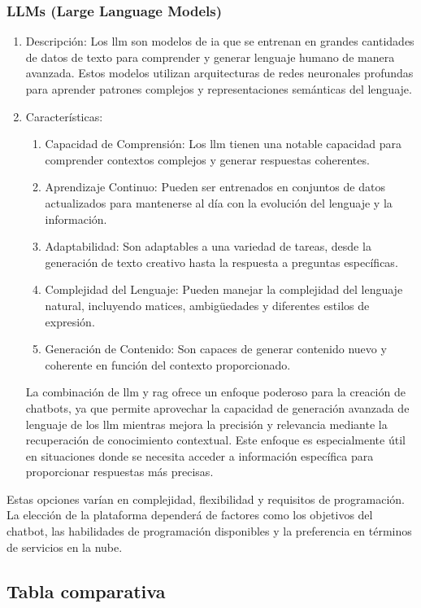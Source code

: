 \subsubsection{LLMs (Large Language Models)}
\begin{enumerate}
\item Descripción: Los \acrfull{llm} son modelos de \acrlong{ia} que se entrenan en grandes cantidades de datos de texto para comprender y generar lenguaje humano de manera avanzada. Estos modelos utilizan arquitecturas de redes neuronales profundas para aprender patrones complejos y representaciones semánticas del lenguaje.
\item Características:
\begin{enumerate}
\item Capacidad de Comprensión: Los \acrshort{llm} tienen una notable capacidad para comprender contextos complejos y generar respuestas coherentes.
\item Aprendizaje Continuo: Pueden ser entrenados en conjuntos de datos actualizados para mantenerse al día con la evolución del lenguaje y la información.
\item Adaptabilidad: Son adaptables a una variedad de tareas, desde la generación de texto creativo hasta la respuesta a preguntas específicas.
\item Complejidad del Lenguaje: Pueden manejar la complejidad del lenguaje natural, incluyendo matices, ambigüedades y diferentes estilos de expresión.
\item Generación de Contenido: Son capaces de generar contenido nuevo y coherente en función del contexto proporcionado.
\end{enumerate}
La combinación de \acrshort{llm} y \acrshort{rag} ofrece un enfoque poderoso para la creación de chatbots, ya que permite aprovechar la capacidad de generación avanzada de lenguaje de los \acrshort{llm} mientras mejora la precisión y relevancia mediante la recuperación de conocimiento contextual. Este enfoque es especialmente útil en situaciones donde se necesita acceder a información específica para proporcionar respuestas más precisas.
\end{enumerate}

Estas opciones varían en complejidad, flexibilidad y requisitos de programación. La elección de la plataforma dependerá de factores como los objetivos del chatbot, las habilidades de programación disponibles y la preferencia en términos de servicios en la nube.

\subsection{Tabla comparativa}

